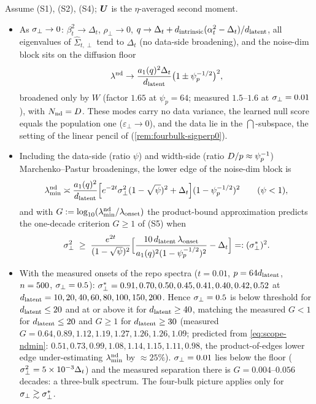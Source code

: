 \begin{proposition}\label{prop:scope-sigperp}
Assume (S1), (S2), (S4); $\bm{U}$ is the $\eta$-averaged second moment.
\begin{itemize}
\item[(i)] As $\sigma_{\perp}\to0$: $\beta_t^2\to\Delta_t$, $\rho_\perp\to0$, $q\to\Delta_t+d_{\mathrm{intrinsic}}(\alpha_t^2-\Delta_t)/d_{\mathrm{latent}}$, all eigenvalues of $\hat\Sigma_{t,\perp}$ tend to $\Delta_t$ (no data-side broadening), and the noise-dim block sits on the diffusion floor
\begin{equation}\label{eq:scope-floor}
\lambda^{\rm nd}\to\frac{a_1(q)^2\Delta_t}{d_{\mathrm{latent}}}\big(1\pm\psi_p^{-1/2}\big)^2,
\end{equation}
broadened only by $W$ (factor $1.65$ at $\psi_p=64$; measured $1.5$--$1.6$ at $\sigma_{\perp}=0.01$), with $N_{\rm nd}=D$. These modes carry no data variance, the learned null score equals the population one ($\varepsilon_\perp\to0$), and the data lie in the $\dint$-subspace, the setting of the linear pencil of \citet{george2025dsm} (\cref{rem:fourbulk-sigperp0}).
\item[(ii)] Including the data-side (ratio $\psi$) and width-side (ratio $D/p\approx\psi_p^{-1}$) Marchenko--Pastur broadenings, the lower edge of the noise-dim block is
\begin{equation}\label{eq:scope-ndmin}
\lambda^{\rm nd}_{\min}\asymp\frac{a_1(q)^2}{d_{\mathrm{latent}}}\Big[e^{-2t}\sigma_{\perp}^2(1-\sqrt\psi)^2+\Delta_t\Big](1-\psi_p^{-1/2})^2\qquad(\psi<1),
\end{equation}
and with $G:=\log_{10}(\lambda^{\rm nd}_{\min}/\lambda_{\rm onset})$ the product-bound approximation predicts the one-decade criterion $G\ge1$ of (S5) when
\begin{equation}\label{eq:scope-sigthr}
\sigma_{\perp}^2\;\ge\;\frac{e^{2t}}{(1-\sqrt\psi)^2}\Big[\frac{10\,d_{\mathrm{latent}}\,\lambda_{\rm onset}}{a_1(q)^2(1-\psi_p^{-1/2})^2}-\Delta_t\Big]=:(\sigma_{\perp}^*)^2 .
\end{equation}
\item[(iii)] With the measured onsets of the repo spectra ($t=0.01$, $p=64d_{\mathrm{latent}}$, $n=500$, $\sigma_{\perp}=0.5$): $\sigma_{\perp}^*=0.91,0.70,0.50,0.45,0.41,0.40,0.42,0.52$ at $d_{\mathrm{latent}}=10,20,40,60,80,100,150,200$. Hence $\sigma_{\perp}=0.5$ is below threshold for $d_{\mathrm{latent}}\le20$ and at or above it for $d_{\mathrm{latent}}\ge40$, matching the measured $G<1$ for $d_{\mathrm{latent}}\le20$ and $G\ge1$ for $d_{\mathrm{latent}}\ge30$ (measured $G=0.64,0.89,1.12,1.19,1.27,1.26,1.26,1.09$; predicted from \eqref{eq:scope-ndmin}: $0.51,0.73,0.99,1.08,1.14,1.15,1.11,0.98$, the product-of-edges lower edge under-estimating $\lambda^{\rm nd}_{\min}$ by $\approx25\%$). $\sigma_{\perp}=0.01$ lies below the floor ($\sigma_{\perp}^2=5\times10^{-3}\Delta_t$) and the measured separation there is $G=0.004$--$0.056$ decades: a three-bulk spectrum. The four-bulk picture applies only for $\sigma_{\perp}\gtrsim\sigma_{\perp}^*$.
\end{itemize}
\end{proposition}

